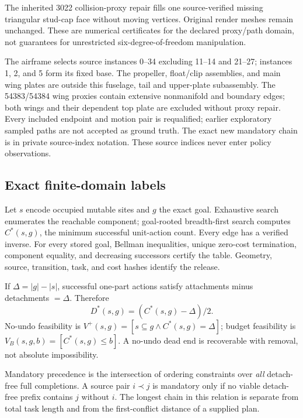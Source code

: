 \documentclass[10pt,twocolumn]{article}
\begin{document}
The inherited 3022 collision-proxy repair fills one source-verified missing
triangular stud-cap face without moving vertices. Original render meshes remain
unchanged. These are numerical certificates for the declared proxy/path domain,
not guarantees for unrestricted six-degree-of-freedom manipulation.

\begin{table}[t]
\centering\small
\caption{Frozen case bank. Roadster and kart share LEGO 31027; airframe is from
LEGO 31028. Counts describe separate state graphs, not independent trials.}

\label{tab:cases}
\end{table}

The airframe selects source instances 0--34 excluding 11--14 and 21--27;
instances 1, 2, and 5 form its fixed base. The propeller, float/clip assemblies,
and main wing plates are outside this fuselage, tail and upper-plate subassembly.
The 54383/54384 wing proxies contain extensive nonmanifold and boundary edges;
both wings and their dependent top plate are excluded without proxy repair.
Every included endpoint and
motion pair is requalified; earlier exploratory sampled paths are not accepted
as ground truth. The exact new mandatory chain is \AirframeSourceChain{}
in private source-index notation. These source indices never enter policy
observations.

\subsection{Exact finite-domain labels}
Let $s$ encode occupied mutable sites and $g$ the exact goal. Exhaustive search
enumerates the reachable component; goal-rooted breadth-first search computes
$C^*(s,g)$, the minimum successful unit-action count. Every edge has a verified
inverse. For every stored goal, Bellman inequalities, unique zero-cost
termination, component equality, and decreasing successors certify the table.
Geometry, source, transition, task, and cost hashes identify the release.

If $\Delta=|g|-|s|$, successful one-part actions satisfy
attachments minus detachments $=\Delta$. Therefore
\[
D^*(s,g)=(C^*(s,g)-\Delta)/2.
\]
No-undo feasibility is $V^+(s,g)=[s\subseteq g \land C^*(s,g)=\Delta]$;
budget feasibility is $V_B(s,g,b)=[C^*(s,g)\le b]$.
A no-undo dead end is recoverable with removal, not absolute impossibility.

Mandatory precedence is the intersection of ordering constraints over
\emph{all} detach-free full completions. A source pair $i\prec j$ is mandatory
only if no viable detach-free prefix contains $j$ without $i$.
The longest chain in this relation is separate from total task length and
from the first-conflict distance of a supplied plan.
\end{document}
